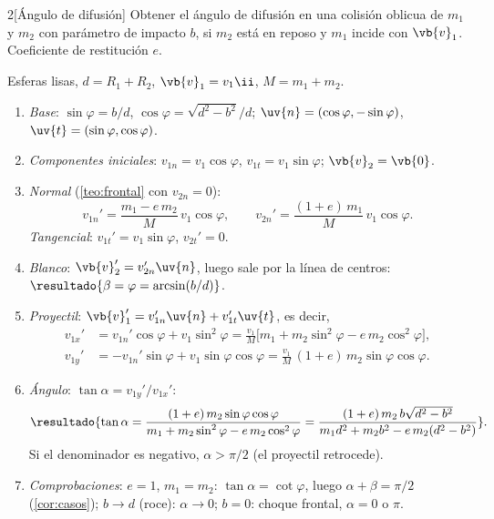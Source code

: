 \begin{problema}{2}[Ángulo de difusión]
\label{prob:2}
Obtener el ángulo de difusión en una colisión oblicua de $m_{1}$ y $m_{2}$ con parámetro de
impacto $b$, si $m_{2}$ está en reposo y $m_{1}$ incide con $\vb{v}_{1}$. Coeficiente de restitución $e$.
\end{problema}

\begin{resolucion}
Esferas lisas, $d=R_{1}+R_{2}$, $\vb{v}_{1}=v_{1}\ii$, $M=m_{1}+m_{2}$.
\begin{enumerate}
  \item \emph{Base}: $\sin\varphi=b/d$, $\cos\varphi=\sqrt{d^{2}-b^{2}}/d$;
        $\uv{n}=(\cos\varphi,-\sin\varphi)$, $\uv{t}=(\sin\varphi,\cos\varphi)$.
  \item \emph{Componentes iniciales}: $v_{1n}=v_{1}\cos\varphi$, $v_{1t}=v_{1}\sin\varphi$; $\vb{v}_{2}=\vb{0}$.
  \item \emph{Normal} (\cref{teo:frontal} con $v_{2n}=0$):
        \[
          v_{1n}'=\frac{m_{1}-e\,m_{2}}{M}\,v_{1}\cos\varphi,\qquad
          v_{2n}'=\frac{(1+e)\,m_{1}}{M}\,v_{1}\cos\varphi .
        \]
        \emph{Tangencial}: $v_{1t}'=v_{1}\sin\varphi$, $v_{2t}'=0$.
  \item \emph{Blanco}: $\vb{v}_{2}'=v_{2n}'\uv{n}$, luego sale por la línea de centros:
        $\resultado{\beta=\varphi=\arcsin(b/d)}$.
  \item \emph{Proyectil}: $\vb{v}_{1}'=v_{1n}'\uv{n}+v_{1t}'\uv{t}$, es decir,
        \begin{align*}
          v_{1x}'&=v_{1n}'\cos\varphi+v_{1}\sin^{2}\varphi
                 =\frac{v_{1}}{M}\bigl[m_{1}+m_{2}\sin^{2}\varphi-e\,m_{2}\cos^{2}\varphi\bigr],\\
          v_{1y}'&=-v_{1n}'\sin\varphi+v_{1}\sin\varphi\cos\varphi
                 =\frac{v_{1}}{M}\,(1+e)\,m_{2}\sin\varphi\cos\varphi .
        \end{align*}
  \item \emph{Ángulo}: $\tan\alpha=v_{1y}'/v_{1x}'$:
        \[
          \resultado{\tan\alpha=\frac{(1+e)\,m_{2}\sin\varphi\cos\varphi}{m_{1}+m_{2}\sin^{2}\varphi-e\,m_{2}\cos^{2}\varphi}
          =\frac{(1+e)\,m_{2}\,b\sqrt{d^{2}-b^{2}}}{m_{1}d^{2}+m_{2}b^{2}-e\,m_{2}(d^{2}-b^{2})}} .
        \]
        Si el denominador es negativo, $\alpha>\pi/2$ (el proyectil retrocede).
  \item \emph{Comprobaciones}: $e=1$, $m_{1}=m_{2}$: $\tan\alpha=\cot\varphi$, luego $\alpha+\beta=\pi/2$ (\cref{cor:casos});
        $b\to d$ (roce): $\alpha\to0$; $b=0$: choque frontal, $\alpha=0$ o $\pi$.\qedhere
\end{enumerate}
\end{resolucion}


